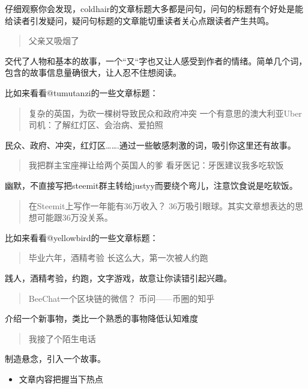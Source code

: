 \documentclass[]{ctexbook}
\providecommand{\tightlist}{%
  \setlength{\itemsep}{0pt}\setlength{\parskip}{0pt}}
\begin{document}
仔细观察你会发现，coldhair的文章标题大多都是问句，问句的标题有个好处是能给读者引发疑问，疑问句标题的文章能切重读者关心点跟读者产生共鸣。

\begin{quote}
父亲又吸烟了
\end{quote}

交代了人物和基本的故事，一个``又``字也又让人感受到作者的情绪。简单几个词，包含的故事信息量确很大，让人忍不住想阅读。

比如来看看@tumutanzi的一些文章标题：

\begin{quote}
复杂的英国，为砍一棵树导致民众和政府冲突
一个有意思的澳大利亚Uber司机：了解红灯区、会治病、爱拍照
\end{quote}

民众、政府、冲突，红灯区\ldots{}\ldots{}.通过一些敏感刺激的词，吸引你这里还有故事。

\begin{quote}
我把群主宝座禅让给两个英国人的爹
看牙医记：牙医建议我多吃软饭
\end{quote}

幽默，不直接写把steemit群主转给justyy而要绕个弯儿，注意饮食说是吃软饭。

\begin{quote}
在Steemit上写作一年能有36万收入？
36万吸引眼球。其实文章想表达的思想可能跟36万没关系。
\end{quote}

比如来看看@yellowbird的一些文章标题：

\begin{quote}
毕业六年，酒精考验
长这么大，第一次被人约跑
\end{quote}

践人，酒精考验，约跑，文字游戏，故意让你读错引起兴趣。

\begin{quote}
BeeChat一个区块链的微信？
币问------币圈的知乎
\end{quote}

介绍一个新事物，类比一个熟悉的事物降低认知难度

\begin{quote}
我接了个陌生电话
\end{quote}

制造悬念，引入一个故事。

\begin{itemize}
\tightlist
\item
  文章内容把握当下热点
\end{itemize}
\end{document}
